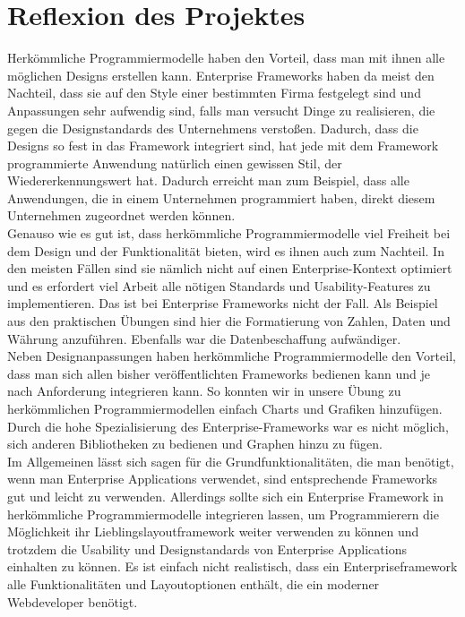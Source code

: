 \section{Reflexion des Projektes}
Herkömmliche Programmiermodelle haben den Vorteil, dass man mit ihnen alle möglichen Designs erstellen kann. Enterprise Frameworks haben da meist den Nachteil, dass sie auf den Style einer bestimmten Firma festgelegt sind und Anpassungen sehr aufwendig sind, falls man versucht Dinge zu realisieren, die gegen die Designstandards des Unternehmens verstoßen. Dadurch, dass die Designs so fest in das Framework integriert sind, hat jede mit dem Framework programmierte Anwendung natürlich einen gewissen Stil, der Wiedererkennungswert hat. Dadurch erreicht man zum Beispiel, dass alle Anwendungen, die in einem Unternehmen programmiert haben, direkt diesem Unternehmen zugeordnet werden können. 
\\
Genauso wie es gut ist, dass herkömmliche Programmiermodelle viel Freiheit bei dem Design und der Funktionalität bieten, wird es ihnen auch zum Nachteil. In den meisten Fällen sind sie nämlich nicht auf einen Enterprise-Kontext optimiert und es erfordert viel Arbeit alle nötigen Standards und Usability-Features zu implementieren. Das ist bei Enterprise Frameworks nicht der Fall. Als Beispiel aus den praktischen Übungen sind hier die Formatierung von Zahlen, Daten und Währung anzuführen. Ebenfalls war die Datenbeschaffung aufwändiger.
\\
Neben Designanpassungen haben herkömmliche Programmiermodelle den Vorteil, dass man sich allen bisher veröffentlichten Frameworks bedienen kann und je nach Anforderung integrieren kann. So konnten wir in unsere Übung zu herkömmlichen Programmiermodellen einfach Charts und Grafiken hinzufügen. Durch die hohe Spezialisierung des Enterprise-Frameworks war es nicht möglich, sich anderen Bibliotheken zu bedienen und Graphen hinzu zu fügen.
\\
Im Allgemeinen lässt sich sagen für die Grundfunktionalitäten, die man benötigt, wenn man Enterprise Applications verwendet, sind entsprechende Frameworks gut und leicht zu verwenden. Allerdings sollte sich ein Enterprise Framework in herkömmliche Programmiermodelle integrieren lassen, um Programmierern die Möglichkeit ihr Lieblingslayoutframework weiter verwenden zu können und trotzdem die Usability und Designstandards von Enterprise Applications einhalten zu können. Es ist einfach nicht realistisch, dass ein Enterpriseframework alle Funktionalitäten und Layoutoptionen enthält, die ein moderner Webdeveloper benötigt.